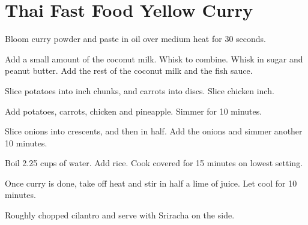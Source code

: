 \section{Thai Fast Food Yellow Curry}
\begin{recipe}


        
Bloom curry powder and paste  in oil over medium heat for 30 seconds. 


Add a small amount of the coconut milk. Whisk to combine. Whisk in sugar and peanut butter. 
Add the rest of the coconut milk and the fish sauce. 


Slice potatoes into  inch chunks, and carrots into discs. Slice chicken  inch. 

Add potatoes, carrots, chicken and pineapple. Simmer for 10 minutes. 

Slice onions into crescents, and then in half. Add the onions and simmer another 10 minutes. 


Boil 2.25 cups of water. Add rice. Cook covered for 15 minutes on lowest setting. 


Once curry is done, take off heat and stir in half a lime of juice. Let cool for 10 minutes. 

Roughly chopped cilantro and serve with Sriracha on the side. 

\end{recipe}
